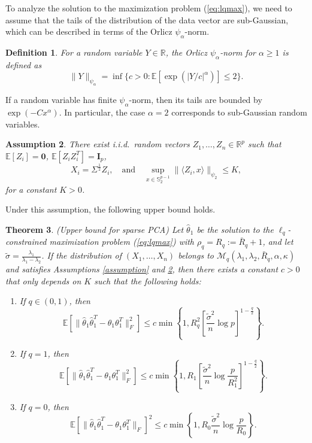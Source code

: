 \documentclass[11pt]{article}
\newtheorem{theorem}{Theorem}[subsection]
\newtheorem{definition}[theorem]{Definition}
\newtheorem{assumption}[theorem]{Assumption}
\newcommand{\R}{\mathbb{R}}
\newcommand{\E}{\mathbb{E}}
\begin{document}
To analyze the solution to the maximization problem (\ref{eq:lqmax}), we need to assume that the tails of the distribution of the data vector are sub-Gaussian, which can be described in terms of the Orlicz $\psi_\alpha$-norm.
\begin{definition}
For a random variable $Y\in\R$, the Orlicz $\psi_\alpha$-norm for $\alpha\ge 1$ is defined as
\begin{equation*}
\|Y\|_{\psi_\alpha} = \inf\{c>0: \E[\exp(|Y/c|^\alpha)]\le 2\}.
\end{equation*}
\end{definition}
If a random variable has finite $\psi_\alpha$-norm, then its tails are bounded by $\exp(-Cx^\alpha)$. In particular, the case $\alpha=2$ corresponds to sub-Gaussian random variables. 
\begin{assumption}\label{assumption2}
There exist i.i.d.\ random vectors $Z_1,\dots,Z_n\in\R^p$ such that $\E[Z_i] = \mathbf{0}$, $\E[Z_iZ_i^T] = \mathbf{I}_p$,
\begin{equation*}
X_i = \Sigma^\frac{1}{2}Z_i, \quad \text{and}\quad \sup_{x\in \mathbb{S}^{p-1}_2}\|\langle Z_i, x\rangle\|_{\psi_2}\le K,
\end{equation*} 
for a constant $K>0$.
\end{assumption}
Under this assumption, the following upper bound holds. 
\begin{theorem}\label{theorem2}(Upper bound for sparse PCA) Let $\hat\theta_1$ be the solution to the $\ell_q$-constrained maximization problem (\ref{eq:lqmax}) with $\rho_q = R_q := \bar R_q+1$, and let $\tilde{\sigma} = \frac{\lambda_1}{\lambda_1 - \lambda_2}$. If the distribution of $(X_1,\dots,X_n)$ belongs to $\mathcal{M}_q(\lambda_1, \lambda_2, \bar R_q, \alpha, \kappa)$ and satisfies Assumptions \ref{assumption} and \ref{assumption2}, then there exists a constant $c>0$ that only depends on $K$ such that the following holds:
\begin{enumerate}
\item If $q\in (0,1)$, then 
\begin{equation*}
\E\left[\|\hat\theta_1\hat\theta_1^T - \theta_1\theta_1^T\|_F^2\right] \le c\min\left\{ 1, R_q^2 \left[\frac{\tilde\sigma^2}{n}\log p\right]^{1-\frac{q}{2}}\right\}.
\end{equation*}

\item If $q=1$, then 
\begin{equation*}
\E\left[\|\hat\theta_1\hat\theta_1^T - \theta_1\theta_1^T\|_F^2\right] \le c\min\left\{ 1, R_1 \left[\frac{\tilde\sigma^2}{n}\log \frac{p}{R_1^2}\right]^{1-\frac{q}{2}}\right\}.
\end{equation*}

\item If $q=0$, then 
\begin{equation*}
\E\left[\|\hat\theta_1\hat\theta_1^T - \theta_1\theta_1^T\|_F\right]^2 \le c\min\left\{ 1, R_0 \frac{\tilde\sigma^2}{n}\log \frac{p}{R_0}\right\}.
\end{equation*}
\end{enumerate}
\end{theorem}
\end{document}
